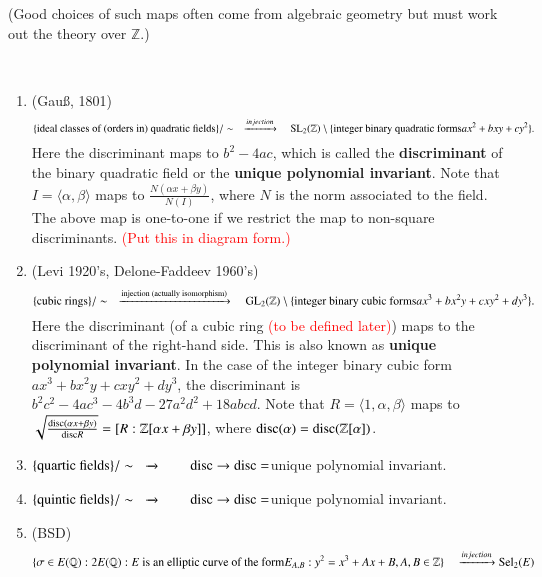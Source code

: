 (Good choices of such maps often come from algebraic geometry but must work out the theory over $\mathbb{Z}$.)
\begin{examples}
{\ }

\begin{enumerate}
\item (Gau\ss{}, 1801)
\begin{equation*}
\{\text{ideal classes of (orders in) quadratic fields}\}/\sim \quad \xrightarrow{injection} \quad {\operatorname{SL}}_{2}(\mathbb{Z})\setminus \{\text{integer binary quadratic forms} ax^{2}+bxy+cy^{2}\}.
\end{equation*}
Here the discriminant maps to $b^{2}-4ac$, which is called the \textbf{discriminant} of the binary quadratic field or the \textbf{unique polynomial invariant}.  Note that $I=\langle \alpha,\beta\rangle$ maps to $\frac{N(\alpha x+\beta y)}{N(I)}$, where $N$ is the norm associated to the field.  The above map is one-to-one if we restrict the map to non-square discriminants.  \textcolor{red}{(Put this in diagram form.)}
\item (Levi 1920's, Delone-Faddeev 1960's)
\begin{equation*}
\{\text{cubic rings}\}/\sim \quad \xrightarrow{\text{injection (actually isomorphism)}} \quad \operatorname{GL}_{2}(\mathbb{Z})\setminus\{\text{integer binary cubic forms} ax^{3}+bx^{2}y+cxy^{2}+dy^{3}\}.
\end{equation*}
Here the discriminant (of a cubic ring \textcolor{red}{(to be defined later)}) maps to the discriminant of the right-hand side.  This is also known as \textbf{unique polynomial invariant}.  In the case of the integer binary cubic form $ax^{3}+bx^{2}y+cxy^{2}+dy^{3}$, the discriminant is $b^{2}c^{2}-4ac^{3}-4b^{3}d-27a^{2}d^{2}+18abcd$.  Note that $R=\langle 1,\alpha,\beta\rangle$ maps to $\sqrt{\frac{{\operatorname{disc}}(\alpha x+\beta y)}{{\operatorname{disc}}{R}}}=[R:\mathbb{Z}[\alpha x+\beta y]]$, where ${\operatorname{disc}}(\alpha)={\operatorname{disc}}(\mathbb{Z}[\alpha])$.
\item $\{\text{quartic fields}\}/\sim \quad \xrightarrow{}\qquad {\operatorname{disc}} \to {\operatorname{disc}}=$unique polynomial invariant.
\item $\{\text{quintic fields}\}/\sim \quad \xrightarrow{}\qquad {\operatorname{disc}} \to {\operatorname{disc}}=$unique polynomial invariant.
\item (BSD)
\begin{align*}
\{\sigma \in E(\mathbb{Q}):2E(\mathbb{Q}): E \text{ is an elliptic curve of the form} E_{A,B}:y^{2}=x^{3}+Ax+B, A,B \in \mathbb{Z}\} \quad &\xrightarrow{injection} \sel_{2}(E) \\

\end{align*}
\end{enumerate}
\end{examples}
